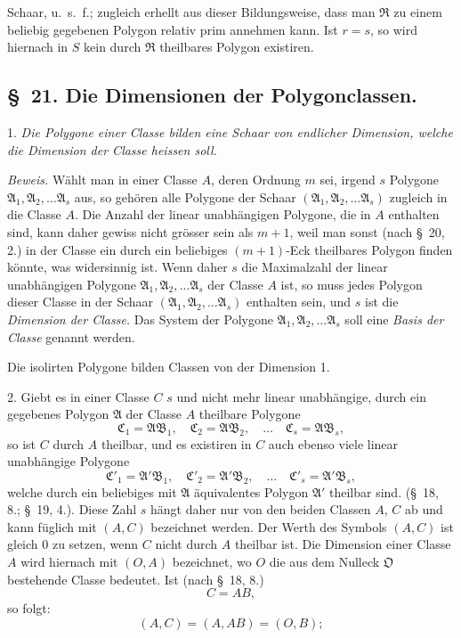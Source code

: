 \documentclass{article}
\begin{document}
Schaar, u.\ s.\ f.; zugleich erhellt aus dieser Bildungsweise, dass man $\mathfrak{R}$ zu einem beliebig gegebenen Polygon relativ prim annehmen kann. Ist $r = s$, so wird hiernach in $S$ kein durch $\mathfrak{R}$ theilbares Polygon existiren.

\subsection*{§~21. Die Dimensionen der Polygonclassen.}

1. \emph{Die Polygone einer Classe bilden eine Schaar von endlicher Dimension, welche die Dimension der Classe heissen soll.}

\emph{Beweis.} Wählt man in einer Classe $A$, deren Ordnung $m$ sei, irgend $s$ Polygone $\mathfrak{A}_{1}, \mathfrak{A}_{2}, \ldots \mathfrak{A}_{s}$ aus, so gehören alle Polygone der Schaar $(\mathfrak{A}_{1}, \mathfrak{A}_{2}, \ldots \mathfrak{A}_{s})$ zugleich in die Classe $A$. Die Anzahl der linear unabhängigen Polygone, die in $A$ enthalten sind, kann daher gewiss nicht grösser sein als $m+1$, weil man sonst (nach §~20, 2.) in der Classe ein durch ein beliebiges $(m+1)$-Eck theilbares Polygon finden könnte, was widersinnig ist. Wenn daher $s$ die Maximalzahl der linear unabhängigen Polygone $\mathfrak{A}_{1}, \mathfrak{A}_{2}, \ldots \mathfrak{A}_{s}$ der Classe $A$ ist, so muss jedes Polygon dieser Classe in der Schaar $(\mathfrak{A}_{1}, \mathfrak{A}_{2}, \ldots \mathfrak{A}_{s})$ enthalten sein, und $s$ ist die \emph{Dimension der Classe.} Das System der Polygone $\mathfrak{A}_{1}, \mathfrak{A}_{2}, \ldots \mathfrak{A}_{s}$ soll eine \emph{Basis der Classe} genannt werden.

Die isolirten Polygone bilden Classen von der Dimension 1.

2. Giebt es in einer Classe $C$ $s$ und nicht mehr linear unabhängige, durch ein gegebenes Polygon $\mathfrak{A}$ der Classe $A$ theilbare Polygone
\[ \mathfrak{C}_{1} = \mathfrak{A}\mathfrak{B}_{1}, \quad \mathfrak{C}_{2} = \mathfrak{A}\mathfrak{B}_{2}, \quad \ldots \quad \mathfrak{C}_{s} = \mathfrak{A}\mathfrak{B}_{s}, \]
so ist $C$ durch $A$ theilbar, und es existiren in $C$ auch ebenso viele linear unabhängige Polygone
\[ \mathfrak{C}'_{1} = \mathfrak{A}'\mathfrak{B}_{1}, \quad \mathfrak{C}'_{2} = \mathfrak{A}'\mathfrak{B}_{2}, \quad \ldots \quad \mathfrak{C}'_{s} = \mathfrak{A}'\mathfrak{B}_{s}, \]
welche durch ein beliebiges mit $\mathfrak{A}$ äquivalentes Polygon $\mathfrak{A}'$ theilbar sind. (§~18, 8.; §~19, 4.). Diese Zahl $s$ hängt daher nur von den beiden Classen $A$, $C$ ab und kann füglich mit $(A, C)$ bezeichnet werden. Der Werth des Symbols $(A, C)$ ist gleich 0 zu setzen, wenn $C$ nicht durch $A$ theilbar ist. Die Dimension einer Classe $A$ wird hiernach mit $(O, A)$ bezeichnet, wo $O$ die aus dem Nulleck $\mathfrak{O}$ bestehende Classe bedeutet. Ist (nach §~18, 8.)
\[ C = AB, \]
so folgt:
\[ (A, C) = (A, AB) = (O, B); \tag{1.} \]
\end{document}
